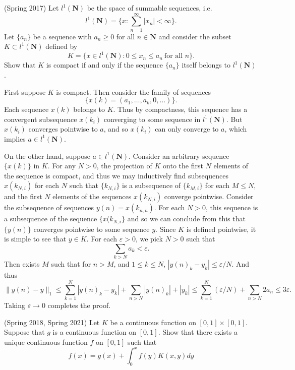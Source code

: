 \documentclass[answers]{exam}
\theoremstyle{problemstyle}
\newcommand{\1}[1]{\textbf{1}_{\left[#1\right]}} %
\begin{document}
\begin{questions}
\question (Spring 2017)
    Let $l^1(\mathbf{N})$ be the space of summable sequences, i.e.
    \[ l^1(\mathbf{N}) = \{ x : \sum_{n = 1}^\infty |x_n| < \infty \}. \]
    Let $\{ a_n \}$ be a sequence with $a_n \geq 0$ for all $n \in \mathbf{N}$ and consider the subset $K \subset l^1(\mathbf{N})$ defined by
    \[ K = \{ x \in l^1(\mathbf{N}) : 0 \leq x_n \leq a_n\ \text{for all $n$} \}. \]
    Show that $K$ is compact if and only if the sequence $\{ a_n \}$ itself belongs to $l^1(\mathbf{N})$.
\begin{solution}
    First suppose $K$ is compact. Then consider the family of sequences
    \[ \{ x(k) = (a_1,\dots,a_k,0,\dots) \}. \]
    Each sequence $x(k)$ belongs to $K$. Thus by compactness, this sequence has a convergent subsequence $x(k_i)$ converging to some sequence in $l^1(\mathbf{N})$. But $x(k_i)$ converges pointwise to $a$, and so $x(k_i)$ can only converge to $a$, which implies $a \in l^1(\mathbf{N})$.
    
    On the other hand, suppose $a \in l^1(\mathbf{N})$. Consider an arbitrary sequence $\{ x(k) \}$ in $K$. For any $N > 0$, the projection of $K$ onto the first $N$ elements of the sequence is compact, and thus we may inductively find subsequences $x(k_{N,i})$ for each $N$ such that $\{ k_{N,i} \}$ is a subsequence of $\{ k_{M,i} \}$ for each $M \leq N$, and the first $N$ elements of the sequences $x(k_{N,i})$ converge pointwise. Consider the subsequence of sequences $y(n) = x(k_{n,n})$. For each $N > 0$, this sequence is a subsequence of the sequence $\{ x(k_{N,i} \}$ and so we can conclude from this that $\{ y(n) \}$ converges pointwise to some sequence $y$. Since $K$ is defined pointwise, it is simple to see that $y \in K$. For each $\varepsilon > 0$, we pick $N > 0$ such that
    \[ \sum_{k > N} a_k < \varepsilon. \]
    Then exists $M$ such that for $n > M$, and $1 \leq k \leq N$, $|y(n)_k - y_k| \leq \varepsilon / N$. And thus
    \[ \| y(n) - y \|_1 \leq \sum_{k = 1}^N |y(n)_k - y_k| + \sum_{n > N} |y(n)_k| + |y_k| \leq \sum_{k = 1}^N (\varepsilon / N) + \sum_{n > N} 2a_n \leq 3\varepsilon. \]
    Taking $\varepsilon \to 0$ completes the proof.
\end{solution}

\question (Spring 2018, Spring 2021)
  Let $K$ be a continuous function on $[0,1]\times [0,1]$. Suppose that $g$ is a continuous function on $[0,1]$. Show that there exists a unique continuous function $f$ on $[0,1]$ such that
  \begin{equation*}
    f(x)=g(x)+\int_{0}^{x}f(y)K(x,y)dy
  \end{equation*}


\end{questions}
\end{document}
